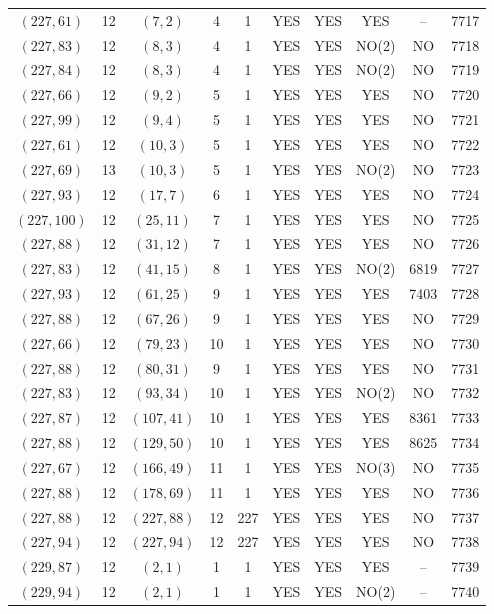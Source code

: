 \begin{longtable}{|c|c|c|c|c|c|c|c|c|c|}
$(227, 61)$ & 12 & $(7, 2)$ & 4 & 1 & YES & YES & YES & -- & 7717\\
$(227, 83)$ & 12 & $(8, 3)$ & 4 & 1 & YES & YES & NO(2) & NO & 7718\\
$(227, 84)$ & 12 & $(8, 3)$ & 4 & 1 & YES & YES & NO(2) & NO & 7719\\
$(227, 66)$ & 12 & $(9, 2)$ & 5 & 1 & YES & YES & YES & NO & 7720\\
$(227, 99)$ & 12 & $(9, 4)$ & 5 & 1 & YES & YES & YES & NO & 7721\\
$(227, 61)$ & 12 & $(10, 3)$ & 5 & 1 & YES & YES & YES & NO & 7722\\
$(227, 69)$ & 13 & $(10, 3)$ & 5 & 1 & YES & YES & NO(2) & NO & 7723\\
$(227, 93)$ & 12 & $(17, 7)$ & 6 & 1 & YES & YES & YES & NO & 7724\\
$(227, 100)$ & 12 & $(25, 11)$ & 7 & 1 & YES & YES & YES & NO & 7725\\
$(227, 88)$ & 12 & $(31, 12)$ & 7 & 1 & YES & YES & YES & NO & 7726\\
$(227, 83)$ & 12 & $(41, 15)$ & 8 & 1 & YES & YES & NO(2) & 6819 & 7727\\
$(227, 93)$ & 12 & $(61, 25)$ & 9 & 1 & YES & YES & YES & 7403 & 7728\\
$(227, 88)$ & 12 & $(67, 26)$ & 9 & 1 & YES & YES & YES & NO & 7729\\
$(227, 66)$ & 12 & $(79, 23)$ & 10 & 1 & YES & YES & YES & NO & 7730\\
$(227, 88)$ & 12 & $(80, 31)$ & 9 & 1 & YES & YES & YES & NO & 7731\\
$(227, 83)$ & 12 & $(93, 34)$ & 10 & 1 & YES & YES & NO(2) & NO & 7732\\
$(227, 87)$ & 12 & $(107, 41)$ & 10 & 1 & YES & YES & YES & 8361 & 7733\\
$(227, 88)$ & 12 & $(129, 50)$ & 10 & 1 & YES & YES & YES & 8625 & 7734\\
$(227, 67)$ & 12 & $(166, 49)$ & 11 & 1 & YES & YES & NO(3) & NO & 7735\\
$(227, 88)$ & 12 & $(178, 69)$ & 11 & 1 & YES & YES & YES & NO & 7736\\
$(227, 88)$ & 12 & $(227, 88)$ & 12 & 227 & YES & YES & YES & NO & 7737\\
$(227, 94)$ & 12 & $(227, 94)$ & 12 & 227 & YES & YES & YES & NO & 7738\\
$(229, 87)$ & 12 & $(2, 1)$ & 1 & 1 & YES & YES & YES & -- & 7739\\
$(229, 94)$ & 12 & $(2, 1)$ & 1 & 1 & YES & YES & NO(2) & -- & 7740\\

\end{longtable}
